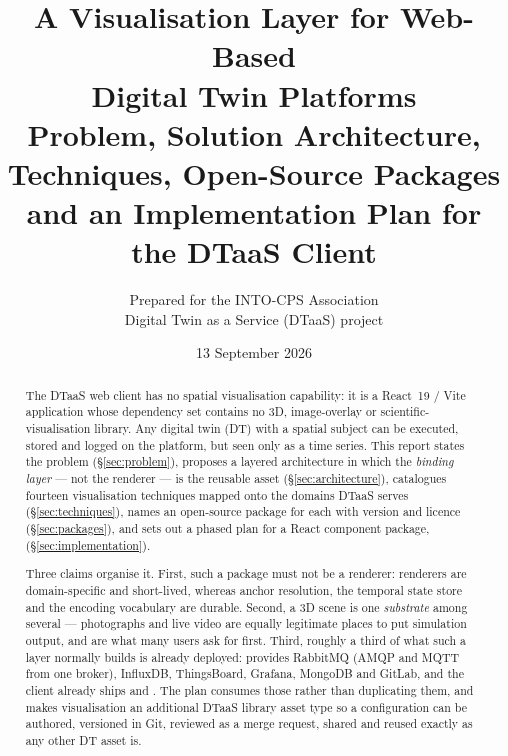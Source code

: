 \documentclass[11pt,a4paper]{article}
\title{\bfseries A Visualisation Layer for Web-Based\\ Digital Twin Platforms\\[0.3em]
\large Problem, Solution Architecture, Techniques, Open-Source Packages\\
and an Implementation Plan for the DTaaS Client}
\author{Prepared for the INTO-CPS Association \\ Digital Twin as a Service (DTaaS) project}
\date{13 September 2026}
\begin{document}
\maketitle
\thispagestyle{fancy}

\begin{abstract}
\noindent
The DTaaS web client has no spatial visualisation capability: it is a React~19 / Vite
application whose dependency set contains no 3D, image-overlay or
scientific-visualisation library. Any digital twin (DT) with a spatial subject can be
executed, stored and logged on the platform, but seen only as a time series. This report
states the problem (\S\ref{sec:problem}), proposes a layered architecture in which the
\emph{binding layer} --- not the renderer --- is the reusable asset
(\S\ref{sec:architecture}), catalogues fourteen visualisation techniques mapped onto the
domains DTaaS serves (\S\ref{sec:techniques}), names an open-source package for each with
version and licence (\S\ref{sec:packages}), and sets out a phased plan for a React
component package,  (\S\ref{sec:implementation}).

Three claims organise it. First, such a package must not be a renderer: renderers are
domain-specific and short-lived, whereas anchor resolution, the temporal state store and
the encoding vocabulary are durable. Second, a 3D scene is one \emph{substrate} among
several --- photographs and live video are equally legitimate places to put simulation
output, and are what many users ask for first. Third, roughly a third of what such a
layer normally builds is already deployed:  provides RabbitMQ (AMQP
and MQTT from one broker), InfluxDB, ThingsBoard, Grafana, MongoDB and GitLab, and the
client already ships  and . The plan consumes
those rather than duplicating them, and makes visualisation an additional DTaaS library
asset type so a configuration can be authored, versioned in Git, reviewed as a merge
request, shared and reused exactly as any other DT asset is.
\end{abstract}










\appendix




\end{document}
